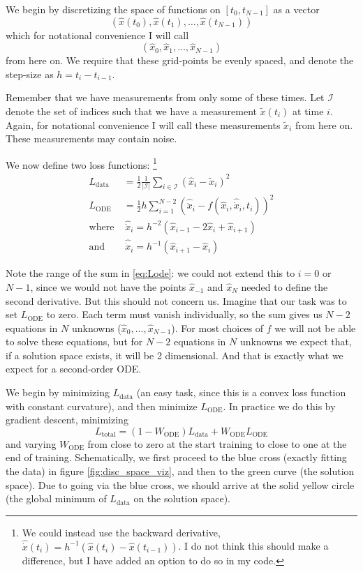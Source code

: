 \documentclass{article}
\begin{document}
We begin by discretizing the space of functions on $[t_0, t_{N-1}]$ as a vector
$$
\left( \hat{x}(t_0), \hat{x}(t_1), \dots, \hat{x}(t_{N-1}) \right)
$$
which for notational convenience I will call
$$
\left( \hat{x}_0, \hat{x}_1, \dots, \hat{x}_{N-1} \right)
$$
from here on.
We require that these grid-points be evenly spaced, and denote the step-size as $h = t_i - t_{i-1}$.

Remember that we have measurements from only some of these times.
Let $\mathcal{I}$ denote the set of indices such that we have a measurement $\tilde{x}(t_i)$ at time $i$.
Again, for notational convenience I will call these measurements $\tilde{x}_i$ from here on.
These measurements may contain noise.

We now define two loss functions:%
\footnote{
We could instead use the backward derivative, $\hat{\dot{x}}(t_i) = h^{-1} \left( \hat{x}(t_{i}) -  \hat{x}(t_{i-1})\right)$. I do not think this should make a difference, but I have added an option to do so in my code.
}
\begin{align}
\label{eq:Ldata}
L_{\mathrm{data}} &= \frac{1}{2} \frac{1}{\left| \mathcal{I} \right|} \sum_{i \in \mathcal{I}} \left( \hat{x}_i - \tilde{x}_i \right)^2 \\
\label{eq:Lode}
L_{\mathrm{ODE}} &= \frac{1}{2} h \sum_{i=1}^{N-2} \left( \hat{\ddot{x}}_i - f\left( \hat{x}_i, \hat{\dot{x}}_i, t_i \right) \right)^2 \\
\mathrm{where} \, & \, \hat{\ddot{x}}_i = h^{-2} \left( \hat{x}_{i-1} - 2\hat{x}_i + \hat{x}_{i+1} \right) \\
\mathrm{and} \, & \, \hat{\dot{x}}_i = h^{-1} \left( \hat{x}_{i+1} - \hat{x}_i \right)
\end{align}

Note the range of the sum in \eqref{eq:Lode}: we could not extend this to $i=0$ or $N-1$, since we would not have the points $\hat{x}_{-1}$ and $\hat{x}_N$ needed to define the second derivative.
But this should not concern us.
Imagine that our task was to set $L_{\mathrm{ODE}}$ to zero.
Each term must vanish individually, so the sum gives us $N-2$ equations in $N$ unknowns ($\hat{x}_0, \dots, \hat{x}_{N-1}$).
For most choices of $f$ we will not be able to solve these equations, but for $N-2$ equations in $N$ unknowns we expect that, if a solution space exists, it will be 2 dimensional.
And that is exactly what we expect for a second-order ODE.

We begin by minimizing $L_{\mathrm{data}}$ (an easy task, since this is a convex loss function with constant curvature), and then minimize $L_\mathrm{ODE}$.
In practice we do this by gradient descent, minimizing
$$
L_{\mathrm{total}} = (1 - W_{\mathrm{ODE}}) L_{\mathrm{data}} + W_{\mathrm{ODE}} L_{\mathrm{ODE}}
$$
and varying $W_{\mathrm{ODE}}$ from close to zero at the start training to close to one at the end of training.
Schematically, we first proceed to the blue cross (exactly fitting the data) in figure \ref{fig:disc_space_viz}, and then to the green curve (the solution space).
Due to going via the blue cross, we should arrive at the solid yellow circle (the global minimum of $L_{\mathrm{data}}$ on the solution space).
\end{document}

